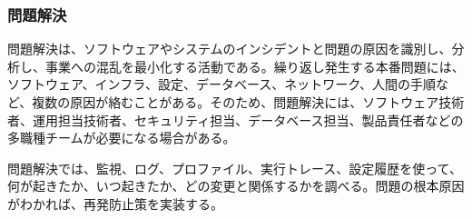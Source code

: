 \subsubsection{問題解決}

問題解決は、ソフトウェアやシステムのインシデントと問題の原因を識別し、分析し、事業への混乱を最小化する活動である。繰り返し発生する本番問題には、ソフトウェア、インフラ、設定、データベース、ネットワーク、人間の手順など、複数の原因が絡むことがある。そのため、問題解決には、ソフトウェア技術者、運用担当技術者、セキュリティ担当、データベース担当、製品責任者などの多職種チームが必要になる場合がある。

問題解決では、監視、ログ、プロファイル、実行トレース、設定履歴を使って、何が起きたか、いつ起きたか、どの変更と関係するかを調べる。問題の根本原因がわかれば、再発防止策を実装する。
